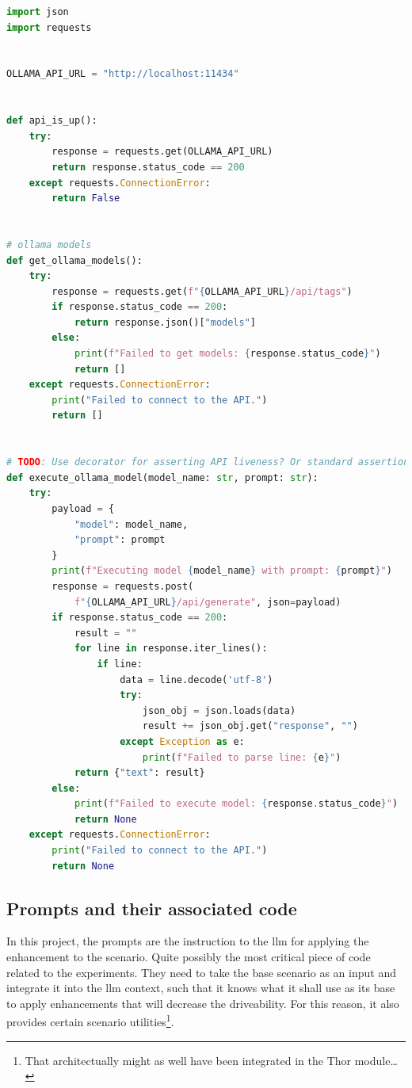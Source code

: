 \begin{lstlisting}[caption={llm\_api\_interfaces/ollama.py, The implementation of an Ollama interface for executing prompts.}, label={lst:thorOllamaInterface}, language={Python}]
import json
import requests


OLLAMA_API_URL = "http://localhost:11434"


def api_is_up():
    try:
        response = requests.get(OLLAMA_API_URL)
        return response.status_code == 200
    except requests.ConnectionError:
        return False


# ollama models
def get_ollama_models():
    try:
        response = requests.get(f"{OLLAMA_API_URL}/api/tags")
        if response.status_code == 200:
            return response.json()["models"]
        else:
            print(f"Failed to get models: {response.status_code}")
            return []
    except requests.ConnectionError:
        print("Failed to connect to the API.")
        return []


# TODO: Use decorator for asserting API liveness? Or standard assertion??
def execute_ollama_model(model_name: str, prompt: str):
    try:
        payload = {
            "model": model_name,
            "prompt": prompt
        }
        print(f"Executing model {model_name} with prompt: {prompt}")
        response = requests.post(
            f"{OLLAMA_API_URL}/api/generate", json=payload)
        if response.status_code == 200:
            result = ""
            for line in response.iter_lines():
                if line:
                    data = line.decode('utf-8')
                    try:
                        json_obj = json.loads(data)
                        result += json_obj.get("response", "")
                    except Exception as e:
                        print(f"Failed to parse line: {e}")
            return {"text": result}
        else:
            print(f"Failed to execute model: {response.status_code}")
            return None
    except requests.ConnectionError:
        print("Failed to connect to the API.")
        return None
\end{lstlisting}

\subsection*{Prompts and their associated code}

In this project, the prompts are the instruction to the \acrfull{llm} for
applying the enhancement to the scenario. Quite possibly the most critical piece
of code related to the experiments. They need to take the base scenario as an
input and integrate it into the \acrshort{llm} context, such that it knows what
it shall use as its base to apply enhancements that will decrease the
driveability. For this reason, it also provides certain scenario
utilities\footnote{That architectually might as well have been integrated in the
    Thor module\ldots}.


